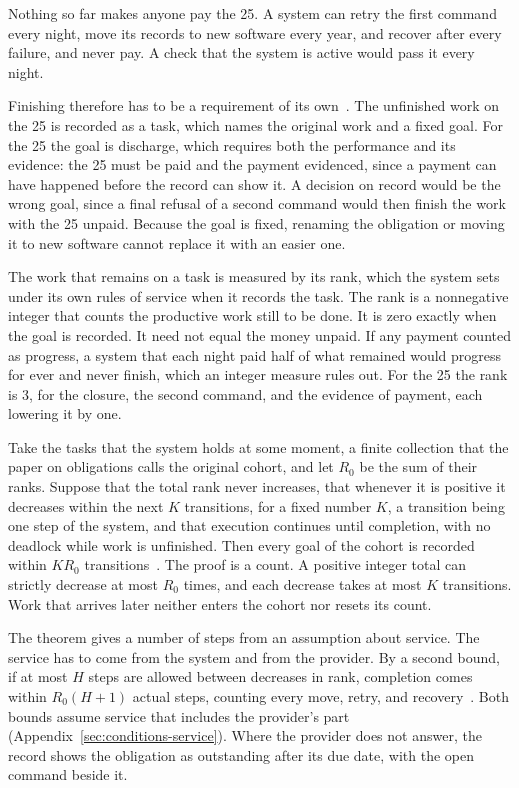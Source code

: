\documentclass{momentum}
\begin{document}
Nothing so far makes anyone pay the 25. A system can retry the first command every night, move its records to new software every year, and recover after every failure, and never pay. A check that the system is active would pass it every night.

Finishing therefore has to be a requirement of its own~\cite[Sections~7.7--7.9]{aot}. The unfinished work on the 25 is recorded as a task, which names the original work and a fixed goal. For the 25 the goal is discharge, which requires both the performance and its evidence: the 25 must be paid and the payment evidenced, since a payment can have happened before the record can show it. A decision on record would be the wrong goal, since a final refusal of a second command would then finish the work with the 25 unpaid. Because the goal is fixed, renaming the obligation or moving it to new software cannot replace it with an easier one.

The work that remains on a task is measured by its rank, which the system sets under its own rules of service when it records the task. The rank is a nonnegative integer that counts the productive work still to be done. It is zero exactly when the goal is recorded. It need not equal the money unpaid. If any payment counted as progress, a system that each night paid half of what remained would progress for ever and never finish, which an integer measure rules out. For the 25 the rank is 3, for the closure, the second command, and the evidence of payment, each lowering it by one.

Take the tasks that the system holds at some moment, a finite collection that the paper on obligations calls the original cohort, and let $R_0$ be the sum of their ranks. Suppose that the total rank never increases, that whenever it is positive it decreases within the next $K$ transitions, for a fixed number $K$, a transition being one step of the system, and that execution continues until completion, with no deadlock while work is unfinished. Then every goal of the cohort is recorded within $KR_0$ transitions~\cite[Theorem~7.15]{aot}. The proof is a count. A positive integer total can strictly decrease at most $R_0$ times, and each decrease takes at most $K$ transitions. Work that arrives later neither enters the cohort nor resets its count.

The theorem gives a number of steps from an assumption about service. The service has to come from the system and from the provider. By a second bound, if at most $H$ steps are allowed between decreases in rank, completion comes within $R_0(H+1)$ actual steps, counting every move, retry, and recovery~\cite[Theorem~7.18]{aot}. Both bounds assume service that includes the provider's part (Appendix~\ref{sec:conditions-service}). Where the provider does not answer, the record shows the obligation as outstanding after its due date, with the open command beside it.
\end{document}
